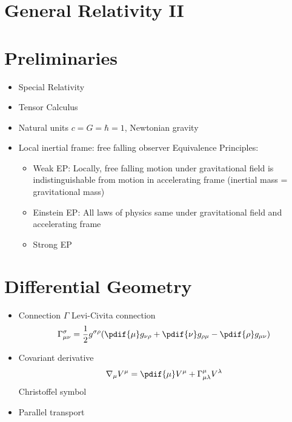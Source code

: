 


\section*{General Relativity \hfill II}

\section{Preliminaries}
\begin{itemize}
\item Special Relativity
\item Tensor Calculus 
\item Natural units $c=G=\hbar = 1$, Newtonian gravity
\item Local inertial frame: free falling observer
Equivalence Principles:
\begin{itemize}
    \item Weak EP: Locally, free falling motion under gravitational field is indistinguishable from motion in accelerating frame (inertial mass = gravitational mass)
    \item Einstein EP: All laws of physics same under gravitational field and accelerating frame 
    \item Strong EP
\end{itemize}
\end{itemize}
\section{Differential Geometry}
\begin{itemize}
    \item Connection $\Gamma$
    Levi-Civita connection
    \[\Gamma^\sigma_{\mu\nu} = \frac12 g^{\sigma\rho}(\pdif{\mu}g_{\nu\rho}+\pdif{\nu}g_{\rho\mu}-\pdif{\rho}g_{\mu\nu})\]
    \item Covariant derivative \[\nabla_\mu V^\mu = \pdif{\mu} V^\mu + \Gamma^\mu_{\mu\lambda} V^\lambda\] Christoffel symbol 
    \item Parallel transport
\end{itemize}


